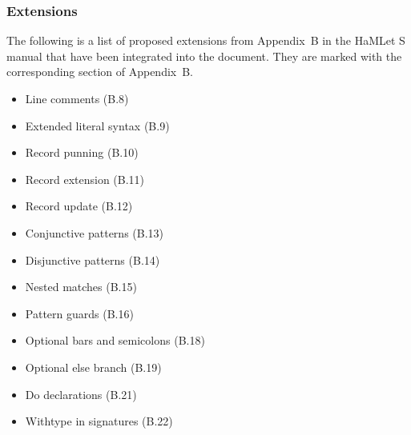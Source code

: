 \subsubsection{Extensions}
The following is a list of proposed extensions from Appendix~B in the HaMLet S manual
that have been integrated into the document.
They are marked with the corresponding section of Appendix~B.
\begin{itemize}
\setlength{\itemsep}{0em}
\item Line comments (B.8)
\item Extended literal syntax (B.9)
\item Record punning (B.10)
\item Record extension (B.11)
\item Record update (B.12)
\item Conjunctive patterns (B.13)
\item Disjunctive patterns (B.14)
\item Nested matches (B.15)
\item Pattern guards (B.16)
\item Optional bars and semicolons (B.18)
\item Optional else branch (B.19)
\item Do declarations (B.21)
\item Withtype in signatures (B.22)
\end{itemize}

